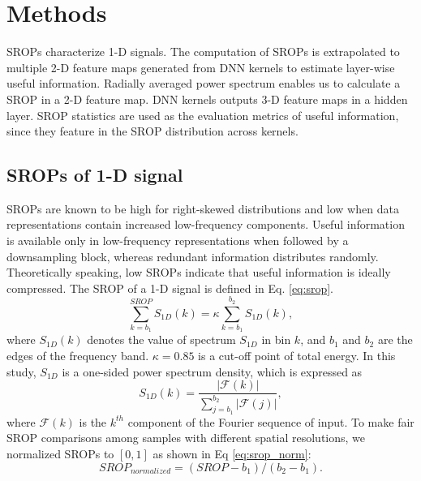 \documentclass{article}
\begin{document}
\section{Methods}
\label{methods}
SROPs characterize 1-D signals. The computation of SROPs is extrapolated to multiple 2-D feature maps generated from DNN kernels to estimate layer-wise useful information. Radially averaged power spectrum enables us to calculate a SROP in a 2-D feature map. DNN kernels outputs 3-D feature maps in a hidden layer. SROP statistics are used as the evaluation metrics of useful information, since they feature in the SROP distribution across kernels.
\subsection{SROPs of 1-D signal}
SROPs are known to be high for right-skewed distributions \cite{SROP} and low when data representations contain increased low-frequency components. Useful information is available only in low-frequency representations when followed by a downsampling block, whereas redundant information distributes randomly. Theoretically speaking, low SROPs indicate that useful information is ideally compressed. The SROP of a 1-D signal is defined in Eq. \ref{eq:srop}.
\begin{equation}
\label{eq:srop}
\sum_{k=b_1}^{SROP}S_{1D}(k)=\kappa \sum_{k=b_1}^{b_2}S_{1D}(k),
\end{equation}
where $S_{1D}(k)$ denotes the value of spectrum $S_{1D}$ in bin $k$, and $b_1$ and $b_2$ are the edges of the frequency band. $\kappa=0.85$ is a cut-off point of total energy. In this study, $S_{1D}$ is a one-sided power spectrum density, which is expressed as 
\begin{equation}
    S_{1D}(k)=\frac{|\mathcal{F}(k)|}{\sum^{b_2}_{j=b_1}{|\mathcal{F}(j)|}},
\end{equation}
where $\mathcal{F}(k)$ is the $k^{th}$ component of the Fourier sequence of input.
To make fair SROP comparisons among samples with different spatial resolutions, we normalized SROPs to $[0,1]$ as shown in Eq \ref{eq:srop_norm}: \begin{equation}\label{eq:srop_norm}SROP_{normalized}=(SROP-b_1)/(b_2-b_1).\end{equation}
\end{document}

